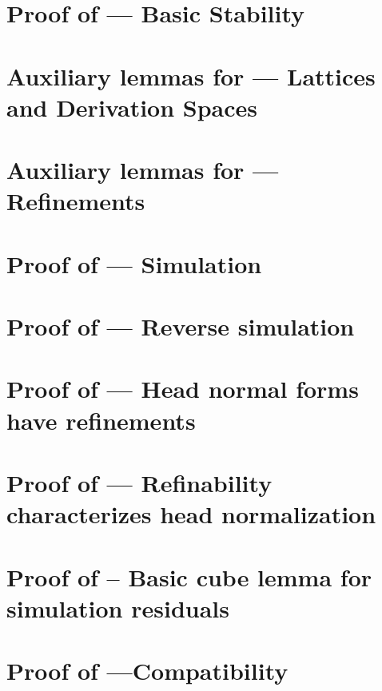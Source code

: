 \section{Proof of  --- Basic Stability}
\label{basic_stability_proof}


\section{Auxiliary lemmas for  --- Lattices and Derivation Spaces}
\label{lemmas_lattices_and_derivation_spaces_proof}


\section{Auxiliary lemmas for  --- Refinements}
\label{refinements_proof}


\section{Proof of  --- Simulation}
\label{simulation_proof}


\section{Proof of  --- Reverse simulation}
\label{reverse_simulation_proof}


\section{Proof of  --- Head normal forms have refinements}
\label{hnf_has_refinement_proof}


\section{Proof of  --- Refinability characterizes head normalization}
\label{has_hnf_has_refinement_proof}


\section{Proof of  -- Basic cube lemma for simulation residuals}
\label{cube_lemma_for_simulation_residuals_proof}


\section{Proof of  ---Compatibility}
\label{compatibility_of_simulation_residuals_and_permutation_equivalence_proof}




